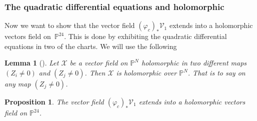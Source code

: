 \documentclass[pdftex]{sigma}
\numberwithin{equation}{section}
\newtheorem{Lemma}[Theorem]{Lemma}
\newtheorem{Proposition}[Theorem]{Proposition}
 { \theoremstyle{definition}
\newtheorem{Definition}[Theorem]{Definition}
\newtheorem{Note}[Theorem]{Note}
\newtheorem{Example}[Theorem]{Example}
\newtheorem{Remark}[Theorem]{Remark} }
\begin{document}
\subsubsection{The quadratic differential equations and holomorphic}
Now we want to show that the vector field
$(\varphi_c)_{\ast}\mathcal{V}_1$ extends into a
holomorphic vectors field on~$\mathbb{P}^{24}$.
 This is done by
exhibiting the quadratic differential equations in two of the
charts. We will use the following
\begin{Lemma}[{\cite{al_Moer3}}] Let $\mathcal{X}$ be a vector field on
$\mathbb{P}^{N}$ holomorphic in two different maps $(Z_i\neq
0)$ and $(Z_j\neq 0)$. Then $\mathcal{X}$ is
holomorphic over $\mathbb{P}^{N}$. That is to say on any map
$(Z_j\neq 0)$.
\end{Lemma}
\begin{Proposition} The vector field
$(\varphi_c)_{\ast}\mathcal{V}_1$ extends into a
holomorphic vectors field on $\mathbb{P}^{24}$.
\end{Proposition}
\end{document}
